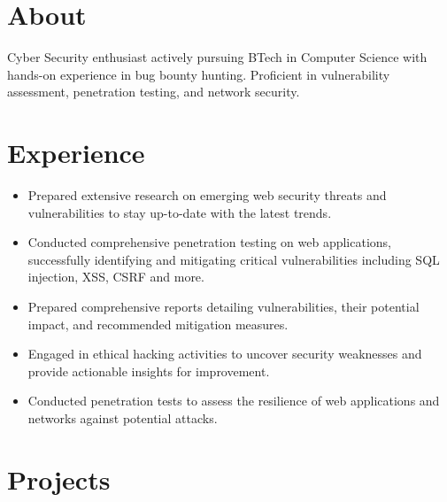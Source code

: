 \documentclass[]{roshan-resume}
\begin{document}
	\begin{minipage}[t]{0.66\textwidth} 
		
		\section{About}
		Cyber Security enthusiast actively pursuing BTech in Computer Science with hands-on experience in bug bounty hunting. Proficient in vulnerability assessment, penetration testing, and network security. 
		
		
		\section{Experience}
		\begin{itemize}
			\item Prepared extensive research on emerging web security threats and vulnerabilities to stay up-to-date with the latest trends. \\
			\item Conducted comprehensive penetration testing on web applications, successfully identifying and mitigating critical vulnerabilities including SQL injection, XSS, CSRF and more.
			\item Prepared comprehensive reports detailing
			vulnerabilities, their potential impact, and
			recommended mitigation measures. \\
			\item Engaged in ethical hacking activities to uncover
			security weaknesses and provide actionable insights for
			improvement.\\
			\item Conducted penetration tests to assess the resilience of
			web applications and networks against potential
			attacks.\\
		\end{itemize}
		
		\section{Projects}

\end{minipage}
\end{document}

